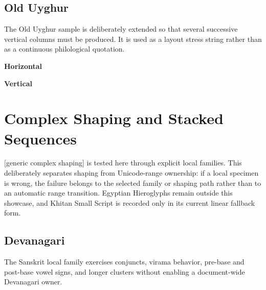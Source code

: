 \bigskip

\subsection{Old Uyghur}

The Old Uyghur sample is deliberately extended so that several successive
vertical columns must be produced. It is used as a layout stress string rather
than as a continuous philological quotation.

\noindent
\begin{minipage}[t]{0.47\linewidth}
\raggedright
\textbf{Horizontal}

\medskip

\end{minipage}
\hfill
\begin{minipage}[t]{0.47\linewidth}
\raggedright
\textbf{Vertical}

\medskip

\end{minipage}


\section{Complex Shaping and Stacked Sequences}

[generic complex shaping] is tested here through explicit local families.
This deliberately separates shaping from Unicode-range ownership: if a local
specimen is wrong, the failure belongs to the selected family or shaping path
rather than to an automatic range transition. Egyptian Hieroglyphs remain
outside this showcase, and Khitan Small Script is recorded only in its current
linear fallback form.

\subsection{Devanagari}

The Sanskrit local family exercises conjuncts, virama behavior, pre-base and
post-base vowel signs, and longer clusters without enabling a document-wide
Devanagari owner.

